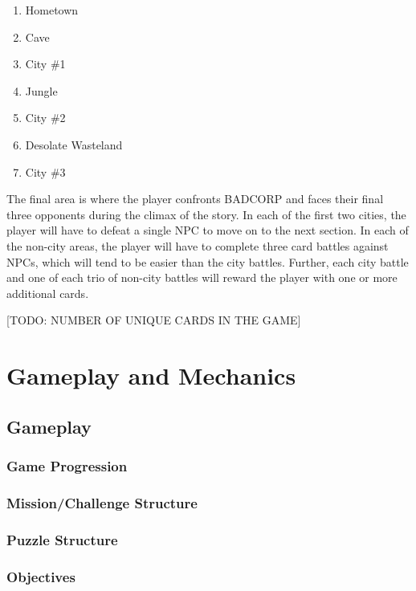 \documentclass[12pt,titlepage]{article}
\newcommand\evilcorp{BADCORP\xspace}
\begin{document}
\begin{enumerate}
    \item Hometown
    \item Cave
    \item City \#1
    \item Jungle
    \item City \#2
    \item Desolate Wasteland
    \item City \#3
\end{enumerate}

The final area is where the player confronts \evilcorp and faces their final
three opponents during the climax of the story. In each of the first two cities,
the player will have to defeat a single NPC to move on to the next section. In
each of the non-city areas, the player will have to complete three card battles
against NPCs, which will tend to be easier than the city battles. Further, each
city battle and one of each trio of non-city battles will reward the player with
one or more additional cards.

[TODO: NUMBER OF UNIQUE CARDS IN THE GAME]

\newpage
\section{Gameplay and Mechanics}

\subsection{Gameplay}

\subsubsection{Game Progression}

\subsubsection{Mission/Challenge Structure}

\subsubsection{Puzzle Structure}

\subsubsection{Objectives}
\end{document}

